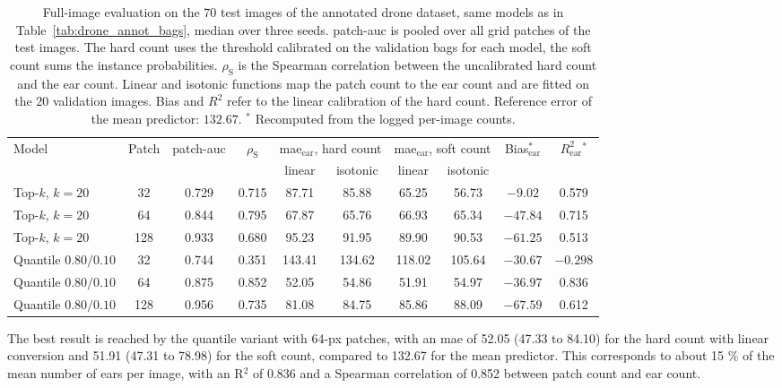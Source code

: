\documentclass[12pt,parskip = half, DIV=classic,listof=totoc]{scrartcl}
\begin{document}
		\begin{table}[htbp]
			\centering
			\scriptsize
			\setlength{\tabcolsep}{4pt}
			\begin{tabular}{@{}lccccccccc@{}}
				\toprule
				\multirow{2}{*}{Model} & \multirow{2}{*}{Patch} & \multirow{2}{*}{patch-\acs*{auc}} & \multirow{2}{*}{$\rho_{\text{S}}$} & \multicolumn{2}{c}{\acs*{mae}$_{\text{ear}}$, hard count} & \multicolumn{2}{c}{\acs*{mae}$_{\text{ear}}$, soft count} & \multirow{2}{*}{Bias$_{\text{ear}}^{\ast}$} & \multirow{2}{*}{$R^2_{\text{ear}}{}^{\ast}$} \\
				\cmidrule(lr){5-6}\cmidrule(lr){7-8}
				& & & & linear & isotonic & linear & isotonic & & \\
				\midrule
				Top-$k$, $k=20$ & 32 & 0.729 & 0.715 & 87.71 & 85.88 & 65.25 & 56.73 & $-9.02$ & 0.579 \\
				Top-$k$, $k=20$ & 64 & 0.844 & 0.795 & 67.87 & 65.76 & 66.93 & 65.34 & $-47.84$ & 0.715 \\
				Top-$k$, $k=20$ & 128 & 0.933 & 0.680 & 95.23 & 91.95 & 89.90 & 90.53 & $-61.25$ & 0.513 \\
				\midrule
				Quantile $0.80/0.10$ & 32 & 0.744 & 0.351 & 143.41 & 134.62 & 118.02 & 105.64 & $-30.67$ & $-0.298$ \\
				Quantile $0.80/0.10$ & 64 & 0.875 & 0.852 & 52.05 & 54.86 & 51.91 & 54.97 & $-36.97$ & 0.836 \\
				Quantile $0.80/0.10$ & 128 & 0.956 & 0.735 & 81.08 & 84.75 & 85.86 & 88.09 & $-67.59$ & 0.612 \\
				\bottomrule
			\end{tabular}
			\caption[Full-image evalutaion]{Full-image evaluation on the $70$ test images of the annotated drone dataset, same models as in
			Table~\ref{tab:drone_annot_bags}, median over three seeds. patch-\acs*{auc} is pooled over all grid patches of the
			test images. The hard count uses the threshold calibrated on the validation bags for each model, the soft
			count sums the instance probabilities. $\rho_{\text{S}}$ is the Spearman correlation between the uncalibrated
			hard count and the ear count. Linear and isotonic functions map the patch count to the ear count and are
			fitted on the $20$ validation images. Bias and $R^2$ refer to the linear calibration of the hard count.
			Reference error of the mean predictor: $132.67$. $^{\ast}$ Recomputed from the logged per-image counts.}
			\label{tab:drone_fullimage}
		\end{table}

		The best result is reached by the quantile variant with 64-px patches, with an \ac{mae} of 52.05 (47.33 to 84.10) 
		for the hard count with linear conversion and 51.91 (47.31 to 78.98) for the soft count, compared to 132.67 
		for the mean predictor. This corresponds to about 15 \% of the mean number of ears per image, with an R$^2$ 
		of 0.836 and a Spearman correlation of 0.852 between patch count and ear count.
\end{document}
